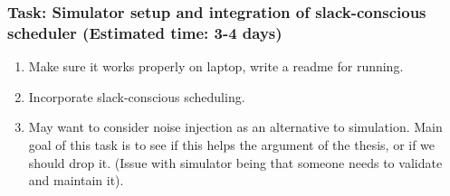 \begin{frame} [Tasks] 
\frametitle{Task: Simulator setup and integration of slack-conscious scheduler (Estimated time: 3-4 days)}
\begin{enumerate} 
\item Make sure it works properly on laptop, write a readme for running. \\
\item Incorporate slack-conscious scheduling. \\
\item May want to consider noise injection as an alternative to simulation.  Main 
goal of this task is to see if this helps the argument of the thesis, or if 
we should drop it.  (Issue with simulator being that someone needs to validate and maintain it).  \\
\end{enumerate} 
\end{frame} 



